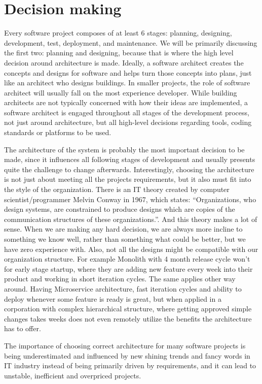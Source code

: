 \section{Decision making}
Every software project composes of at least 6 stages: planning, designing, development, test, deployment, and maintenance. We will be primarily discussing the first two: planning and designing, because that is where the high level decision around architecture is made. Ideally, a software architect creates the concepts and designs for software and helps turn those concepts into plans, just like an architect who designs buildings. In smaller projects, the role of software architect will usually fall on the most experience developer. While building architects are not typically concerned with how their ideas are implemented, a software architect is engaged throughout all stages of the development process, not just around architecture, but all high-level decisions regarding tools, coding standards or platforms to be used.

The architecture of the system is probably the most important decision to be made, since it influences all following stages of development and usually presents quite the challenge to change afterwards. Interestingly, choosing the architecture is not just about meeting all the projects requirements, but it also must fit into the style of the organization. There is an IT theory created by computer scientist/programmer Melvin Conway in 1967, which states: ``Organizations, who design systems, are constrained to produce designs which are copies of the communication structures of these organizations.''\cite{paper:conway:1968}. And this theory makes a lot of sense. When we are making any hard decision, we are always more incline to something we know well, rather than something what could be better, but we have zero experience with. Also, not all the designs might be compatible with our organization structure. For example Monolith with 4 month release cycle won't for early stage startup, where they are adding new feature every week into their product and working in short iteration cycles. The same applies other way around. Having Microservice architecture, fast iteration cycles and ability to deploy whenever some feature is ready is great, but when applied in a corporation with complex hierarchical structure, where getting approved simple changes takes weeks does not even remotely utilize the benefits the architecture has to offer.

The importance of choosing correct architecture for many software projects is being underestimated and influenced by new shining trends and fancy words in IT industry instead of being primarily driven by requirements, and it can lead to unstable, inefficient and overpriced projects.

